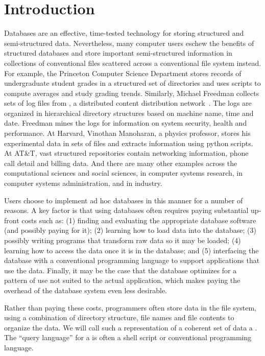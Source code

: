 \section {Introduction}
\label{sec:intro}

Databases are an effective, time-tested technology for storing
structured and semi-structured data.  Nevertheless, many computer
users eschew the benefits of structured databases and store important
semi-structured information in collections of conventional files
scattered across a conventional file system instead.  For example, the
Princeton Computer Science Department
stores records of undergraduate student grades in a structured set of
directories and uses scripts to compute averages and
study grading trends.  Similarly, Michael Freedman collects
sets of log files from \coral, a distributed content distribution
network~\cite{freedman+:coral,freedman:coral-experience}.  
The logs are organized in hierarchical
directory structures based on machine name, time and date.  Freedman
mines the logs for information on system security, health and performance.  At
Harvard, Vinothan Manoharan, a physics professor, stores 
his experimental data in sets of files and
extracts information using python scripts.  At AT\&T, vast structured
repositories contain networking information,
phone call detail and billing data.  And there are
many other examples across the computational sciences and social
sciences, in computer systems research, in computer
systems administration, and in industry.

Users choose to implement ad hoc databases in this manner for a number
of reasons. A key factor is  that using
databases often requires paying substantial up-front costs such as:
(1) finding and evaluating the appropriate database software (and
possibly paying for it); (2) learning how to load data into the
database; (3) possibly writing programs that transform raw data 
so it may be loaded; (4) learning how
to access the data once it is in the database; and (5) interfacing the
database with a conventional programming language to support
applications that use the data.  Finally, it may be the case that the
database optimizes for a pattern of use not suited to the actual
application, which makes paying the overhead of the database system even
less desirable. 

Rather than paying these costs, programmers often store data in
the file system, using a combination of directory structure, file
names and file contents to organize the data.  We will call such a
representation of a coherent set of data a \textit{\filestore{}}.
The ``query language'' for a \filestore{}
is often a shell script or conventional programming language.

